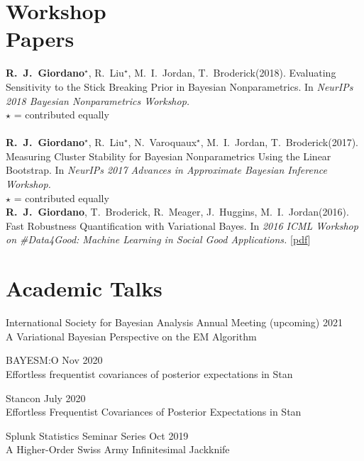 \documentclass[margin,line]{res}
\newcommand{\me}{\textbf{R.~J.~Giordano}\xspace}
\newcommand{\tamara}{T.~Broderick\xspace}
\newcommand{\mike}{M.~I.~Jordan\xspace}
\newcommand{\runjing}{R.~Liu\xspace}
\newcommand{\paperref}[1]{[\href{#1}{pdf}]}
\newcommand{\paperref}[1]{}
\begin{document}
\begin{resume}
\section{\sc Workshop \\ Papers}

\me$^\star$, \runjing$^\star$, \mike, \tamara (2018).
Evaluating Sensitivity to the Stick Breaking Prior in Bayesian Nonparametrics.
In \emph{NeurIPs 2018 Bayesian Nonparametrics Workshop.}\\
$\star$ = contributed equally\\
\paperref{https://arxiv.org/abs/1810.06587}\\

\me$^\star$, \runjing$^\star$, N.~Varoquaux$^\star$, \mike, \tamara (2017).
Measuring Cluster Stability for Bayesian Nonparametrics Using the Linear Bootstrap.
In \emph{NeurIPs 2017 Advances in Approximate Bayesian Inference Workshop.}\\
$\star$ = contributed equally\\
\paperref{https://arxiv.org/abs/1712.01435}

\me, \tamara, R.~Meager, J.~Huggins, \mike (2016). Fast Robustness
Quantification with Variational Bayes. In \emph{2016 ICML Workshop on
\#Data4Good: Machine Learning in Social Good Applications.}
\paperref{https://arxiv.org/abs/1606.07153}




\section{\sc Academic Talks}

International Society for Bayesian Analysis Annual Meeting
\hfill(upcoming) 2021\\
A Variational Bayesian Perspective on the EM Algorithm

BAYESM:O \hfill Nov 2020\\
Effortless frequentist covariances of posterior expectations in Stan

Stancon \hfill July 2020\\
Effortless Frequentist Covariances of Posterior Expectations in Stan

Splunk Statistics Seminar Series \hfill Oct 2019\\
A Higher-Order Swiss Army Infinitesimal Jackknife


\end{resume}
\end{document}
